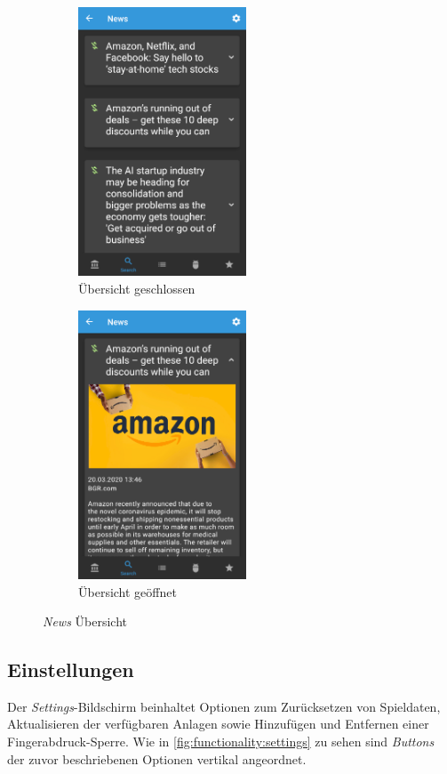 \documentclass[a4paper]{article}
\begin{document}
\begin{figure}[H]
    \begin{subfigure}{.5\textwidth}
        \centering
        \includegraphics[height=8cm,keepaspectratio]{./images/news/news.png}
        \caption{Übersicht geschlossen}
        \label{fig:functionality:news:closed}
    \end{subfigure}
    \begin{subfigure}{.5\textwidth}
        \centering
        \includegraphics[height=8cm,keepaspectratio]{./images/news/news_open.png}
        \caption{Übersicht geöffnet}
        \label{fig:functionality:news:open}
    \end{subfigure}
    \caption{\textit{News} Übersicht}
    \label{fig:functionality:news}
\end{figure}


\subsection{Einstellungen}
\label{subsec:functionality:settings}
Der \textit{Settings}-Bildschirm beinhaltet Optionen zum Zurücksetzen von Spieldaten, Aktualisieren der verfügbaren Anlagen sowie Hinzufügen und Entfernen einer Fin\-ger\-abdruck-Sperre.
Wie in \autoref{fig:functionality:settings} zu sehen sind \textit{Buttons} der zuvor beschriebenen Optionen vertikal angeordnet.
\end{document}
